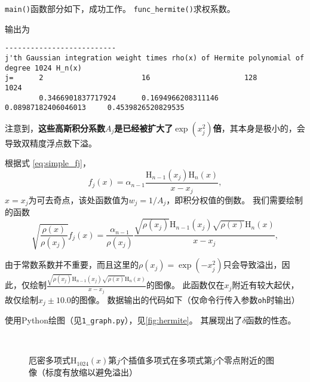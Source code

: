 \documentclass[a4paper,unicode]{report}
\begin{document}
\texttt{main()}函数部分如下，成功工作。
\texttt{func\_hermite()}求权系数。
{
    \linespread{1.0}
    
}
输出为
{
\footnotesize
\begin{verbatim}
--------------------------
j'th Gaussian integration weight times rho(x) of Hermite polynomial of degree 1024 H_n(x)
j=      2                       16                      128                     1024
        0.3466901837717924      0.1694966208311146      0.08987182406046013     0.4539826520829535
\end{verbatim}
}
注意到，\textbf{这些高斯积分系数$A_j$是已经被扩大了$\exp(x_j^2)$倍}，其本身是极小的，会导致双精度浮点数下溢。

根据式 \eqref{eq:simple_fj}，
\begin{equation}
    f_j(x) = \alpha_{n-1} \frac{\mathrm{H}_{n-1}(x_j)\mathrm{H}_n(x)}{x - x_j},
\end{equation}
$x = x_j$为可去奇点，该处函数值为$w_j = 1/A_j$，即积分权值的倒数。
我们需要绘制的函数
\begin{equation}
    \sqrt{\frac{\rho(x)}{\rho(x_j)}}f_j(x)
    = \frac{\alpha_{n-1}}{\rho(x_j)} \frac{\sqrt{\rho(x_j)}\mathrm{H}_{n-1}(x_j)\sqrt{\rho(x)}\mathrm{H}_n(x)}{x - x_j},
\end{equation}

由于常数系数并不重要，而且这里的$\rho(x_j) = \exp(-x_j^2)$只会导致溢出，因此，仅绘制$\frac{\sqrt{\rho(x_j)}\mathrm{H}_{n-1}(x_j)\sqrt{\rho(x)}\mathrm{H}_n(x)}{x - x_j}$的图像。
此函数仅在$x_j$附近有较大起伏，故仅绘制$x_j\pm 10.0$的图像。
数据输出的代码如下（仅命令行传入参数\texttt{oh}时输出）
{
    \linespread{1.0}
    
}
使用\textsf{Python}绘图（见\texttt{1\_graph.py}），见\autoref{fig:hermite}。
其展现出了$\delta$函数的性态。

\begin{figure}
    \centering
    \\
    \caption{厄密多项式$\mathrm{H}_{1024}(x)$第$j$个插值多项式在多项式第$j$个零点附近的图像（标度有放缩以避免溢出）}
    \label{fig:hermite}
\end{figure}
\end{document}

